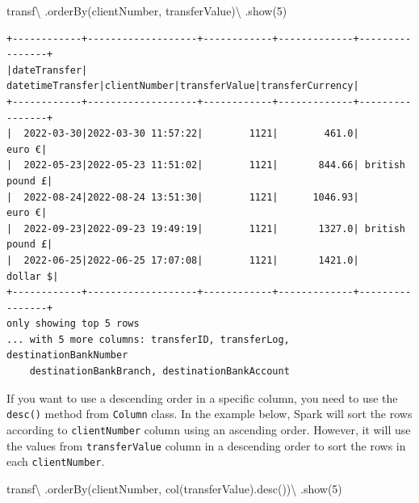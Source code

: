 \documentclass[
  11pt,
  letterpaper,
  DIV=11,
  numbers=noendperiod]{scrreprt}
\newenvironment{Shaded}{\begin{snugshade}}{\end{snugshade}}
\newcommand{\DecValTok}[1]{\textcolor[rgb]{0.68,0.00,0.00}{#1}}
\newcommand{\NormalTok}[1]{\textcolor[rgb]{0.00,0.23,0.31}{#1}}
\newcommand{\OperatorTok}[1]{\textcolor[rgb]{0.37,0.37,0.37}{#1}}
\newcommand{\StringTok}[1]{\textcolor[rgb]{0.13,0.47,0.30}{#1}}
\begin{document}
\begin{Shaded}
\begin{Highlighting}[]
\NormalTok{transf}\OperatorTok{\textbackslash{}}
\NormalTok{  .orderBy(}\StringTok{\textquotesingle{}clientNumber\textquotesingle{}}\NormalTok{, }\StringTok{\textquotesingle{}transferValue\textquotesingle{}}\NormalTok{)}\OperatorTok{\textbackslash{}}
\NormalTok{  .show(}\DecValTok{5}\NormalTok{)}
\end{Highlighting}
\end{Shaded}

\begin{verbatim}
+------------+-------------------+------------+-------------+----------------+
|dateTransfer|   datetimeTransfer|clientNumber|transferValue|transferCurrency|
+------------+-------------------+------------+-------------+----------------+
|  2022-03-30|2022-03-30 11:57:22|        1121|        461.0|          euro €|
|  2022-05-23|2022-05-23 11:51:02|        1121|       844.66| british pound £|
|  2022-08-24|2022-08-24 13:51:30|        1121|      1046.93|          euro €|
|  2022-09-23|2022-09-23 19:49:19|        1121|       1327.0| british pound £|
|  2022-06-25|2022-06-25 17:07:08|        1121|       1421.0|        dollar $|
+------------+-------------------+------------+-------------+----------------+
only showing top 5 rows
... with 5 more columns: transferID, transferLog, destinationBankNumber
    destinationBankBranch, destinationBankAccount
\end{verbatim}

If you want to use a descending order in a specific column, you need to
use the \texttt{desc()} method from \texttt{Column} class. In the
example below, Spark will sort the rows according to
\texttt{clientNumber} column using an ascending order. However, it will
use the values from \texttt{transferValue} column in a descending order
to sort the rows in each \texttt{clientNumber}.

\begin{Shaded}
\begin{Highlighting}[]
\NormalTok{transf}\OperatorTok{\textbackslash{}}
\NormalTok{  .orderBy(}\StringTok{\textquotesingle{}clientNumber\textquotesingle{}}\NormalTok{, col(}\StringTok{\textquotesingle{}transferValue\textquotesingle{}}\NormalTok{).desc())}\OperatorTok{\textbackslash{}}
\NormalTok{  .show(}\DecValTok{5}\NormalTok{)}
\end{Highlighting}
\end{Shaded}
\end{document}
